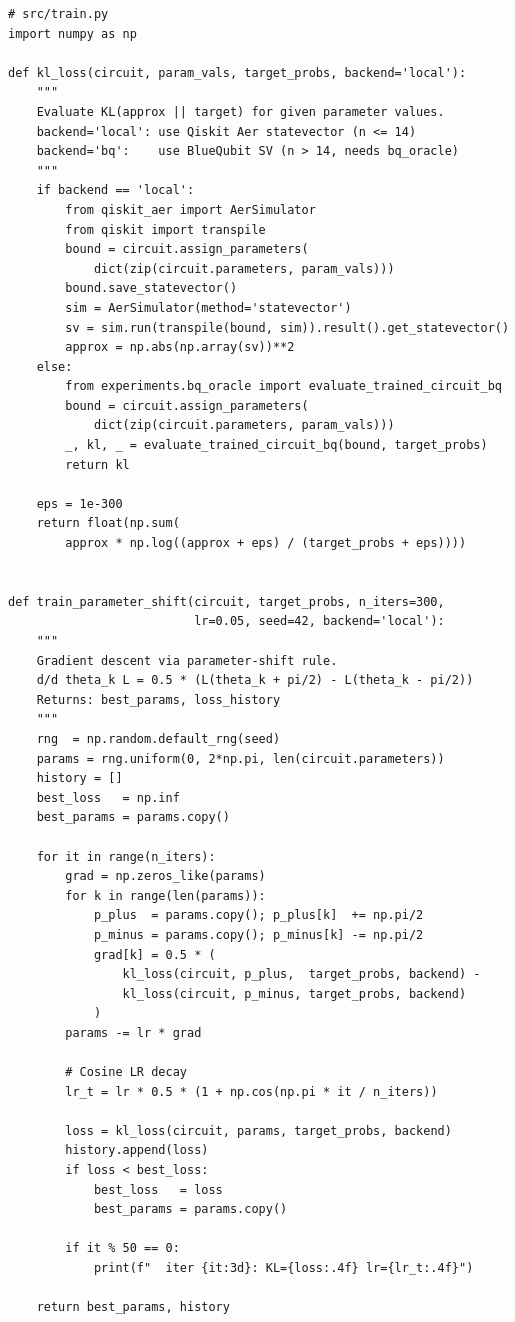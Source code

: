 \documentclass[11pt]{article}
\begin{document}
\begin{lstlisting}
# src/train.py
import numpy as np

def kl_loss(circuit, param_vals, target_probs, backend='local'):
    """
    Evaluate KL(approx || target) for given parameter values.
    backend='local': use Qiskit Aer statevector (n <= 14)
    backend='bq':    use BlueQubit SV (n > 14, needs bq_oracle)
    """
    if backend == 'local':
        from qiskit_aer import AerSimulator
        from qiskit import transpile
        bound = circuit.assign_parameters(
            dict(zip(circuit.parameters, param_vals)))
        bound.save_statevector()
        sim = AerSimulator(method='statevector')
        sv = sim.run(transpile(bound, sim)).result().get_statevector()
        approx = np.abs(np.array(sv))**2
    else:
        from experiments.bq_oracle import evaluate_trained_circuit_bq
        bound = circuit.assign_parameters(
            dict(zip(circuit.parameters, param_vals)))
        _, kl, _ = evaluate_trained_circuit_bq(bound, target_probs)
        return kl

    eps = 1e-300
    return float(np.sum(
        approx * np.log((approx + eps) / (target_probs + eps))))


def train_parameter_shift(circuit, target_probs, n_iters=300,
                          lr=0.05, seed=42, backend='local'):
    """
    Gradient descent via parameter-shift rule.
    d/d theta_k L = 0.5 * (L(theta_k + pi/2) - L(theta_k - pi/2))
    Returns: best_params, loss_history
    """
    rng  = np.random.default_rng(seed)
    params = rng.uniform(0, 2*np.pi, len(circuit.parameters))
    history = []
    best_loss   = np.inf
    best_params = params.copy()

    for it in range(n_iters):
        grad = np.zeros_like(params)
        for k in range(len(params)):
            p_plus  = params.copy(); p_plus[k]  += np.pi/2
            p_minus = params.copy(); p_minus[k] -= np.pi/2
            grad[k] = 0.5 * (
                kl_loss(circuit, p_plus,  target_probs, backend) -
                kl_loss(circuit, p_minus, target_probs, backend)
            )
        params -= lr * grad

        # Cosine LR decay
        lr_t = lr * 0.5 * (1 + np.cos(np.pi * it / n_iters))

        loss = kl_loss(circuit, params, target_probs, backend)
        history.append(loss)
        if loss < best_loss:
            best_loss   = loss
            best_params = params.copy()

        if it % 50 == 0:
            print(f"  iter {it:3d}: KL={loss:.4f} lr={lr_t:.4f}")

    return best_params, history
\end{lstlisting}
\end{document}
